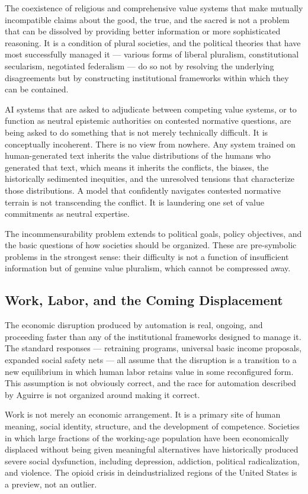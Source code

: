 \documentclass[12pt, a4paper]{article}
\theoremstyle{remark}
\begin{document}
The coexistence of religious and comprehensive value systems that make mutually incompatible claims about the good, the true, and the sacred is not a problem that can be dissolved by providing better information or more sophisticated reasoning. It is a condition of plural societies, and the political theories that have most successfully managed it --- various forms of liberal pluralism, constitutional secularism, negotiated federalism --- do so not by resolving the underlying disagreements but by constructing institutional frameworks within which they can be contained.

AI systems that are asked to adjudicate between competing value systems, or to function as neutral epistemic authorities on contested normative questions, are being asked to do something that is not merely technically difficult. It is conceptually incoherent. There is no view from nowhere. Any system trained on human-generated text inherits the value distributions of the humans who generated that text, which means it inherits the conflicts, the biases, the historically sedimented inequities, and the unresolved tensions that characterize those distributions. A model that confidently navigates contested normative terrain is not transcending the conflict. It is laundering one set of value commitments as neutral expertise.

The incommensurability problem extends to political goals, policy objectives, and the basic questions of how societies should be organized. These are pre-symbolic problems in the strongest sense: their difficulty is not a function of insufficient information but of genuine value pluralism, which cannot be compressed away.

\subsection{Work, Labor, and the Coming Displacement}

The economic disruption produced by automation is real, ongoing, and proceeding faster than any of the institutional frameworks designed to manage it. The standard responses --- retraining programs, universal basic income proposals, expanded social safety nets --- all assume that the disruption is a transition to a new equilibrium in which human labor retains value in some reconfigured form. This assumption is not obviously correct, and the race for automation described by Aguirre is not organized around making it correct.

Work is not merely an economic arrangement. It is a primary site of human meaning, social identity, structure, and the development of competence. Societies in which large fractions of the working-age population have been economically displaced without being given meaningful alternatives have historically produced severe social dysfunction, including depression, addiction, political radicalization, and violence. The opioid crisis in deindustrialized regions of the United States is a preview, not an outlier.
\end{document}
